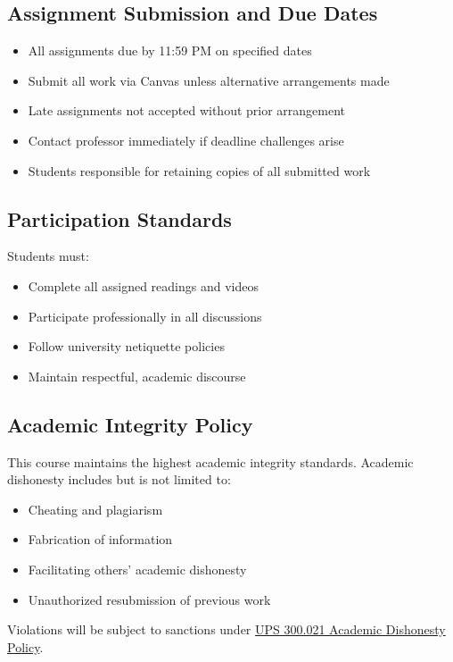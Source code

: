 \documentclass[11pt]{scrartcl} %
\begin{document}
\subsection{Assignment Submission and Due Dates}
\begin{itemize}
\item All assignments due by 11:59 PM on specified dates
\item Submit all work via Canvas unless alternative arrangements made
\item Late assignments not accepted without prior arrangement
\item Contact professor immediately if deadline challenges arise
\item Students responsible for retaining copies of all submitted work
\end{itemize}

\subsection{Participation Standards}
Students must:
\begin{itemize}
\item Complete all assigned readings and videos
\item Participate professionally in all discussions
\item Follow university netiquette policies
\item Maintain respectful, academic discourse
\end{itemize}

\subsection{Academic Integrity Policy}
This course maintains the highest academic integrity standards. Academic dishonesty includes but is not limited to:
\begin{itemize}
\item Cheating and plagiarism
\item Fabrication of information
\item Facilitating others' academic dishonesty
\item Unauthorized resubmission of previous work
\end{itemize}

Violations will be subject to sanctions under \href{https://www.fullerton.edu/senate/publications_policies_resolutions/ups/UPS%20300/UPS%20300.021.pdf}{UPS 300.021 Academic Dishonesty Policy}.
\end{document}

